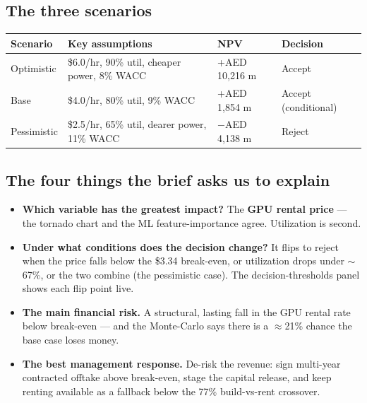 \documentclass[11pt,a4paper]{article}
\begin{document}
\subsection{The three scenarios}
\begin{center}
\begin{tabular}{L{2.4cm} L{5.6cm} l l}
\toprule
\textbf{Scenario} & \textbf{Key assumptions} & \textbf{NPV} & \textbf{Decision}\\
\midrule
Optimistic & \$6.0/hr, 90\% util, cheaper power, 8\% WACC & +AED 10{,}216 m & Accept\\
Base & \$4.0/hr, 80\% util, 9\% WACC & +AED 1{,}854 m & Accept (conditional)\\
Pessimistic & \$2.5/hr, 65\% util, dearer power, 11\% WACC & $-$AED 4{,}138 m & Reject\\
\bottomrule
\end{tabular}
\end{center}

\subsection{The four things the brief asks us to explain}
\begin{itemize}
  \item \textbf{Which variable has the greatest impact?} The \textbf{GPU rental price} --- the tornado
  chart and the ML feature-importance agree. Utilization is second.
  \item \textbf{Under what conditions does the decision change?} It flips to reject when the price falls
  below the \$3.34 break-even, or utilization drops under $\sim$67\%, or the two combine (the
  pessimistic case). The decision-thresholds panel shows each flip point live.
  \item \textbf{The main financial risk.} A structural, lasting fall in the GPU rental rate below
  break-even --- and the Monte-Carlo says there is a $\approx$21\% chance the base case loses money.
  \item \textbf{The best management response.} De-risk the revenue: sign multi-year contracted offtake
  above break-even, stage the capital release, and keep renting available as a fallback below the 77\%
  build-vs-rent crossover.
\end{itemize}

\end{document}
